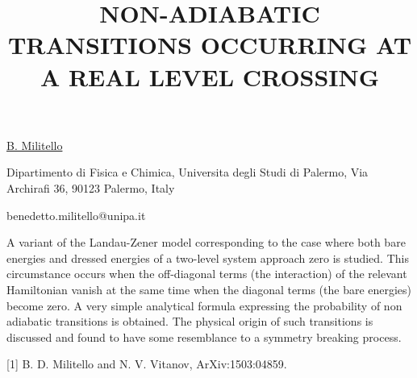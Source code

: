 \title{NON-ADIABATIC TRANSITIONS OCCURRING AT A REAL LEVEL CROSSING}

\underline{B. Militello} 

{\normalsize{\vspace{-4mm}
Dipartimento di Fisica e Chimica,
Universita degli Studi di Palermo,
Via Archirafi 36, 90123 Palermo, Italy

\email benedetto.militello@unipa.it}}

A variant of the Landau-Zener model corresponding to the case where both bare energies and dressed energies of a two-level
system approach zero is studied. This circumstance occurs when the off-diagonal terms (the interaction) of the relevant
Hamiltonian vanish at the same time when the diagonal terms (the bare energies) become zero. A very simple analytical
formula expressing the probability of non adiabatic transitions is obtained. The physical origin of such transitions is discussed
and found to have some resemblance to a symmetry breaking process.

{\normalsize
[1] B. D. Militello and N. V. Vitanov, ArXiv:1503:04859.
}

\vspace{\baselineskip}
